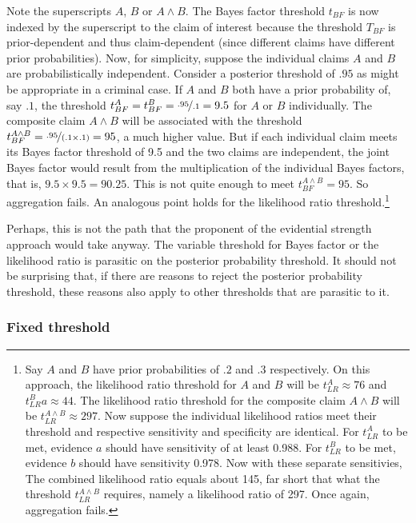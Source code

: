 \documentclass[
  10pt,
  dvipsnames,enabledeprecatedfontcommands]{scrartcl}
\begin{document}
\noindent Note the superscripts \(A\), \(B\) or \(A\wedge B\). The Bayes
factor threshold \(t_{BF}\) is now indexed by the superscript to the
claim of interest because the threshold \(T_{BF}\) is prior-dependent
and thus claim-dependent (since different claims have different prior
probabilities). Now, for simplicity, suppose the individual claims \(A\)
and \(B\) are probabilistically independent. Consider a posterior
threshold of \(.95\) as might be appropriate in a criminal case. If
\(A\) and \(B\) both have a prior probability of, say \(.1\), the
threshold \(t^A_{BF}=t_{BF}^B=\nicefrac{.95}{.1}=9.5\) for \(A\) or
\(B\) individually. The composite claim \(A \wedge B\) will be
associated with the threshold
\(t^{A\wedge B}_{BF}=\nicefrac{.95}{(.1\times .1)}=95\), a much higher
value. But if each individual claim meets its Bayes factor threshold of
9.5 and the two claims are independent, the joint Bayes factor would
result from the multiplication of the individual Bayes factors, that is,
\(9.5 \times 9.5=90.25\). This is not quite enough to meet
\(t^{A\wedge B}_{BF}=95\). So aggregation fails. An analogous point
holds for the likelihood ratio threshold.\footnote{Say \(A\) and \(B\)
  have prior probabilities of \(.2\) and \(.3\) respectively. On this
  approach, the likelihood ratio threshold for \(A\) and \(B\) will be
  \(t_{LR}^{A}\approx 76\) and \(t_{LR}^{B}a\approx 44\). The likelihood
  ratio threshold for the composite claim \(A \wedge B\) will be
  \(t^{A\wedge B}_{LR}\approx 297\). Now suppose the individual
  likelihood ratios meet their threshold and respective sensitivity and
  specificity are identical. For \(t_{LR}^{A}\) to be met, evidence
  \(a\) should have sensitivity of at least 0.988. For \(t_{LR}^{B}\) to
  be met, evidence \(b\) should have sensitivity 0.978. Now with these
  separate sensitivies, The combined likelihood ratio equals about 145,
  far short that what the threshold \(t^{A\wedge B}_{LR}\) requires,
  namely a likelihood ratio of 297. Once again, aggregation fails.}

Perhaps, this is not the path that the proponent of the evidential
strength approach would take anyway. The variable threshold for Bayes
factor or the likelihood ratio is parasitic on the posterior probability
threshold. It should not be surprising that, if there are reasons to
reject the posterior probability threshold, these reasons also apply to
other thresholds that are parasitic to it.

\hypertarget{fixed-threshold}{%
\subsubsection{Fixed threshold}\label{fixed-threshold}}
\end{document}
